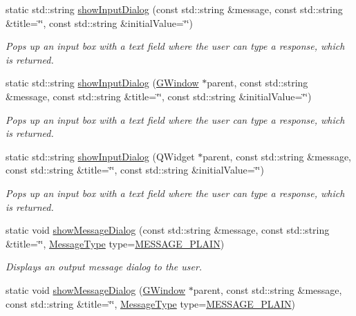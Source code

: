 \begin{DoxyCompactItemize}
static std\+::string \mbox{\hyperlink{classsgl_1_1GOptionPane_a50fdc381453e6b8c495e3f9fe07b7bec}{show\+Input\+Dialog}} (const std\+::string \&message, const std\+::string \&title=\char`\"{}\char`\"{}, const std\+::string \&initial\+Value=\char`\"{}\char`\"{})
\begin{DoxyCompactList}\small\item\em Pops up an input box with a text field where the user can type a response, which is returned. \end{DoxyCompactList}\item 
static std\+::string \mbox{\hyperlink{classsgl_1_1GOptionPane_a035a6d874c9e81773e7c61305dbecabb}{show\+Input\+Dialog}} (\mbox{\hyperlink{classsgl_1_1GWindow}{G\+Window}} $\ast$parent, const std\+::string \&message, const std\+::string \&title=\char`\"{}\char`\"{}, const std\+::string \&initial\+Value=\char`\"{}\char`\"{})
\begin{DoxyCompactList}\small\item\em Pops up an input box with a text field where the user can type a response, which is returned. \end{DoxyCompactList}\item 
static std\+::string \mbox{\hyperlink{classsgl_1_1GOptionPane_aabd3a04a3cdc998ee0e7e7e31676df17}{show\+Input\+Dialog}} (Q\+Widget $\ast$parent, const std\+::string \&message, const std\+::string \&title=\char`\"{}\char`\"{}, const std\+::string \&initial\+Value=\char`\"{}\char`\"{})
\begin{DoxyCompactList}\small\item\em Pops up an input box with a text field where the user can type a response, which is returned. \end{DoxyCompactList}\item 
static void \mbox{\hyperlink{classsgl_1_1GOptionPane_af4df9c721d9e832e17953c9465bfd9ea}{show\+Message\+Dialog}} (const std\+::string \&message, const std\+::string \&title=\char`\"{}\char`\"{}, \mbox{\hyperlink{classsgl_1_1GOptionPane_ac6606ebe91c8ac66a2c314c79f5ab013}{Message\+Type}} type=\mbox{\hyperlink{classsgl_1_1GOptionPane_ac6606ebe91c8ac66a2c314c79f5ab013ac03a17c74c589b004d166532958a6196}{M\+E\+S\+S\+A\+G\+E\+\_\+\+P\+L\+A\+IN}})
\begin{DoxyCompactList}\small\item\em Displays an output message dialog to the user. \end{DoxyCompactList}\item 
static void \mbox{\hyperlink{classsgl_1_1GOptionPane_ac3ad66eb6ee62ad9140d04e38440e782}{show\+Message\+Dialog}} (\mbox{\hyperlink{classsgl_1_1GWindow}{G\+Window}} $\ast$parent, const std\+::string \&message, const std\+::string \&title=\char`\"{}\char`\"{}, \mbox{\hyperlink{classsgl_1_1GOptionPane_ac6606ebe91c8ac66a2c314c79f5ab013}{Message\+Type}} type=\mbox{\hyperlink{classsgl_1_1GOptionPane_ac6606ebe91c8ac66a2c314c79f5ab013ac03a17c74c589b004d166532958a6196}{M\+E\+S\+S\+A\+G\+E\+\_\+\+P\+L\+A\+IN}})

\end{DoxyCompactItemize}
